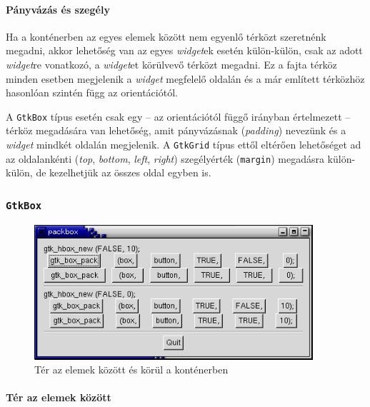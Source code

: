 \paragraph{Pányvázás és szegély}

Ha a konténerben az egyes elemek között nem egyenlő térközt szeretnénk megadni, akkor lehetőség van az egyes \textit{widget}ek esetén külön-külön, csak az adott \textit{widget}re vonatkozó, a \textit{widget}et körülvevő térközt megadni. Ez a fajta térköz minden esetben megjelenik a \textit{widget} megfelelő oldalán és a már említett térközhöz hasonlóan szintén függ az orientációtól.

A \texttt{GtkBox} típus esetén csak egy -- az orientációtól függő irányban értelmezett -- térköz megadására van lehetőség, amit pányvázásnak (\textit{padding}) nevezünk és a \textit{widget} mindkét oldalán megjelenik. A \texttt{GtkGrid} típus ettől eltérően lehetőséget ad az oldalankénti (\textit{top}, \textit{bottom}, \textit{left}, \textit{right}) szegélyérték (\texttt{margin}) megadásra külön-külön, de kezelhetjük az összes oldal egyben is.

\subsubsection{\texttt{GtkBox}}

\vspace{12 pt}
\begin{figure}[H]
\begin{center}
\includegraphics[height=50mm]{images/packbox2.png}
\caption{Tér az elemek között és körül a konténerben\cite{gtktut}}
\end{center}
\end{figure}

\paragraph{Tér az elemek között}

